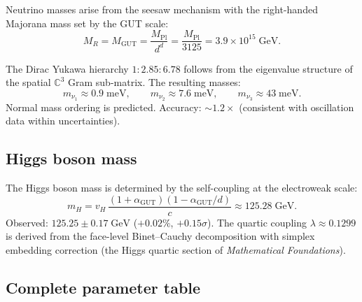 \documentclass[12pt]{article}
\theoremstyle{remark}
\theoremstyle{definition}
\newcommand{\CC}{\mathbb{C}}
\begin{document}
Neutrino masses arise from the seesaw mechanism with the right-handed Majorana mass set by the GUT scale:
\begin{equation}
M_R = M_\text{GUT} = \frac{M_\text{Pl}}{d^d} = \frac{M_\text{Pl}}{3125} = 3.9 \times 10^{15}\;\text{GeV}.
\end{equation}

The Dirac Yukawa hierarchy $1 : 2.85 : 6.78$ follows from the eigenvalue structure of the spatial $\CC^3$ Gram sub-matrix. The resulting masses:
\begin{equation}
m_{\nu_1} \approx 0.9\;\text{meV}, \qquad m_{\nu_2} \approx 7.6\;\text{meV}, \qquad m_{\nu_3} \approx 43\;\text{meV}.
\end{equation}
Normal mass ordering is predicted. Accuracy: $\sim 1.2\times$ (consistent with oscillation data within uncertainties).

\subsection{Higgs boson mass}

The Higgs boson mass is determined by the self-coupling at the electroweak scale:
\begin{equation}
m_H = v_H\,\frac{(1+\alpha_\text{GUT})(1-\alpha_\text{GUT}/d)}{c} \approx 125.28\;\text{GeV}.
\end{equation}
Observed: $125.25 \pm 0.17\;\text{GeV}$ ($+0.02\%$, $+0.15\sigma$).  The quartic coupling $\lambda \approx 0.1299$ is derived from the face-level Binet--Cauchy decomposition with simplex embedding correction (the Higgs quartic section of \textit{Mathematical Foundations}).

\subsection{Complete parameter table}
\end{document}
